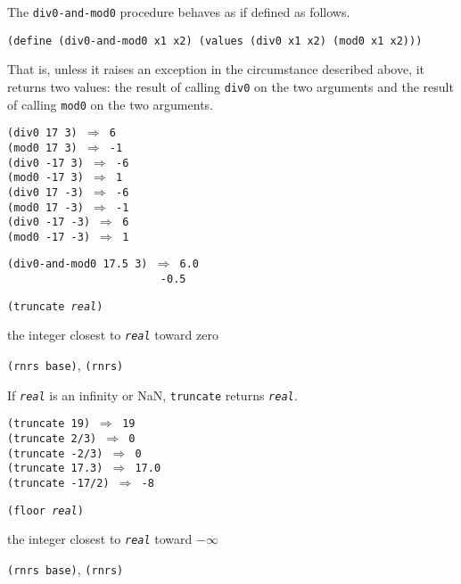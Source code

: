 The \texttt{div0-and-mod0} procedure behaves as if defined as follows.


\texttt{(define (div0-and-mod0 x1 x2) (values (div0 x1 x2) (mod0 x1 x2)))}

That is, unless it raises an exception in the circumstance described
above, it returns two values: the result of calling \texttt{div0} on the
two arguments and the result of calling \texttt{mod0} on the two
arguments.


\begin{alltt}
(div0 17 3) \(\Rightarrow\) 6
(mod0 17 3) \(\Rightarrow\) -1
(div0 -17 3) \(\Rightarrow\) -6
(mod0 -17 3) \(\Rightarrow\) 1
(div0 17 -3) \(\Rightarrow\) -6
(mod0 17 -3) \(\Rightarrow\) -1
(div0 -17 -3) \(\Rightarrow\) 6
(mod0 -17 -3) \(\Rightarrow\) 1

(div0-and-mod0 17.5 3) \(\Rightarrow\) 6.0
                        -0.5
\end{alltt}

\begin{description}

\label{objects_s101}\item[procedure] \texttt{(truncate \textit{real})}



\item[returns] the integer closest to \texttt{\textit{real}} toward zero


\item[libraries] \texttt{(rnrs base)}, \texttt{(rnrs)}
\end{description}


If \texttt{\textit{real}} is an infinity or NaN, \texttt{truncate} returns \texttt{\textit{real}}.


\begin{alltt}
(truncate 19) \(\Rightarrow\) 19
(truncate 2/3) \(\Rightarrow\) 0
(truncate -2/3) \(\Rightarrow\) 0
(truncate 17.3) \(\Rightarrow\) 17.0
(truncate -17/2) \(\Rightarrow\) -8
\end{alltt}

\begin{description}

\label{objects_s102}\item[procedure] \texttt{(floor \textit{real})}



\item[returns] the integer closest to \texttt{\textit{real}} toward \(-\infty\)


\item[libraries] \texttt{(rnrs base)}, \texttt{(rnrs)}
\end{description}


